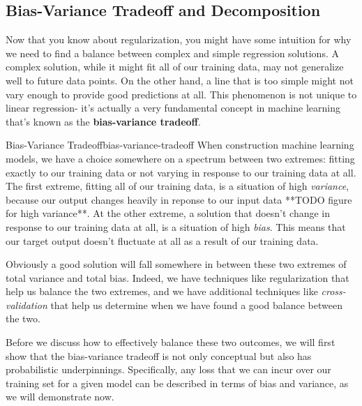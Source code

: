 \subsection{Bias-Variance Tradeoff and Decomposition}
Now that you know about regularization, you might have some intuition for why we need to find a balance between complex and simple regression solutions. A complex solution, while it might fit all of our training data, may not generalize well to future data points. On the other hand, a line that is too simple might not vary enough to provide good predictions at all. This phenomenon is not unique to linear regression- it's actually a very fundamental concept in machine learning that's known as the \textbf{bias-variance tradeoff}.

\begin{definition}{Bias-Variance Tradeoff}{bias-variance-tradeoff}
    When construction machine learning models, we have a choice somewhere on a spectrum between two extremes: fitting exactly to our training data or not varying in response to our training data at all. The first extreme, fitting all of our training data, is a situation of high \textit{variance}, because our output changes heavily in reponse to our input data **TODO figure for high variance**. At the other extreme, a solution that doesn't change in response to our training data at all, is a situation of high \textit{bias}. This means that our target output doesn't fluctuate at all as a result of our training data.
\end{definition}

Obviously a good solution will fall somewhere in between these two extremes of total variance and total bias. Indeed, we have techniques like regularization that help us balance the two extremes, and we have additional techniques like \textit{cross-validation} that help us determine when we have found a good balance between the two.


Before we discuss how to effectively balance these two outcomes, we will first show that the bias-variance tradeoff is not only conceptual but also has probabilistic underpinnings. Specifically, any loss that we can incur over our training set for a given model can be described in terms of bias and variance, as we will demonstrate now.

